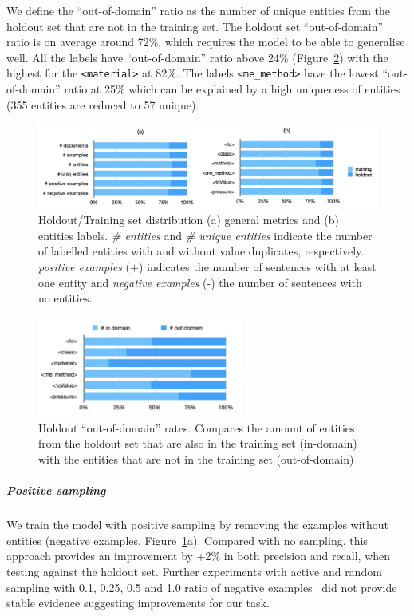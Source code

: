 \documentclass[]{interact}
\theoremstyle{plain}%
\theoremstyle{definition}
\theoremstyle{remark}
\begin{document}
We define the ``out-of-domain'' ratio as the number of unique entities from the holdout set that are not in the training set.
The holdout set ``out-of-domain'' ratio is on average around 72\%, which requires the model to be able to generalise well.
All the labels have ``out-of-domain'' ratio above 24\%  (Figure~\ref{fig:out-domain-holdout}) with the highest for the \texttt{<material>} at 82\%. The labels \texttt{<me\_method>} have the lowest ``out-of-domain'' ratio at 25\% which can be explained by a high uniqueness of entities (355 entities are reduced to 57 unique).

\begin{figure}[ht]
    \centering
    \includegraphics[width=\textwidth]{holdout-training-set}
    \caption{Holdout/Training set distribution (a) general metrics and (b) entities labels.
        \textit{\# entities} and \textit{\# unique entities} indicate the number of labelled entities with and without value duplicates, respectively. \textit{positive examples} (+) indicates the number of sentences with at least one entity and \textit{negative examples} (-) the number of sentences with no entities.}
    \label{fig:training-holdout-set-distribution}
\end{figure}

\begin{figure}[ht]
    \centering
    \includegraphics[width=0.6\textwidth]{out-domain-holdout-unique}
    \caption{Holdout ``out-of-domain'' rates. Compares the amount of entities from the holdout set that are also in the training set (in-domain) with the entities that are not in the training set (out-of-domain)}
    \label{fig:out-domain-holdout}
\end{figure}

\subparagraph*{Positive sampling}
We train the model with positive sampling by removing the examples without entities (negative examples, Figure~\ref{fig:training-holdout-set-distribution}a).
Compared with no sampling, this approach provides an improvement by +2\% in both precision and recall, when testing against the holdout set.
Further experiments with active and random sampling with 0.1, 0.25, 0.5 and 1.0 ratio of negative examples~\cite{lopez2021mining} did not provide stable evidence suggesting improvements for our task.
\end{document}
